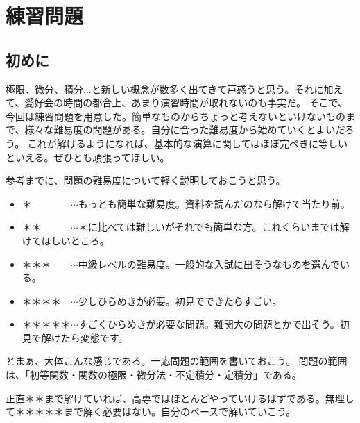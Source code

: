\documentclass[a4j,dvipdfmx]{jsarticle}
\begin{document}
\section*{練習問題}
\subsection*{初めに}
極限、微分、積分...と新しい概念が数多く出てきて戸惑うと思う。それに加えて、愛好会の時間の都合上、あまり演習時間が取れないのも事実だ。
そこで、今回は練習問題を用意した。簡単なものからちょっと考えないといけないものまで、様々な難易度の問題がある。自分に合った難易度から始めていくとよいだろう。
これが解けるようになれば、基本的な演算に関してはほぼ完ぺきに等しいといえる。ぜひとも頑張ってほしい。

参考までに、問題の難易度について軽く説明しておこうと思う。
\begin{itemize}
    \item ＊　　　　$\cdots$もっとも簡単な難易度。資料を読んだのなら解けて当たり前。
    \item ＊＊　　　$\cdots$＊に比べては難しいがそれでも簡単な方。これくらいまでは解けてほしいところ。
    \item ＊＊＊　　$\cdots$中級レベルの難易度。一般的な入試に出そうなものを選んでいる。
    \item ＊＊＊＊　$\cdots$少しひらめきが必要。初見でできたらすごい。
    \item ＊＊＊＊＊$\cdots$すごくひらめきが必要な問題。難関大の問題とかで出そう。初見で解けたら変態です。
\end{itemize}
とまぁ、大体こんな感じである。一応問題の範囲を書いておこう。
問題の範囲は、「初等関数・関数の極限・微分法・不定積分・定積分」である。

正直＊＊まで解けていれば、高専ではほとんどやっていけるはずである。無理して＊＊＊＊＊まで解く必要はない。自分のペースで解いていこう。
\end{document}
